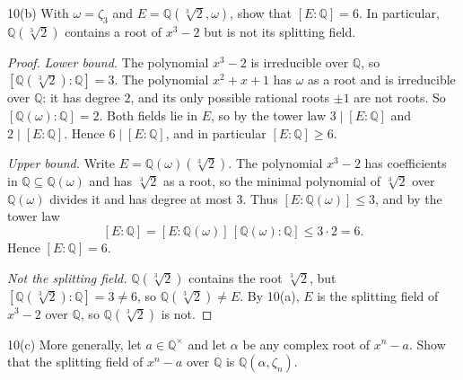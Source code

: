 \documentclass[11pt]{article}
\begin{document}
\begin{problem}{10(b)}
  With $\omega = \zeta_3$ and $E = \mathbb{Q}(\sqrt[3]{2}, \omega)$, show that
  $[E : \mathbb{Q}] = 6$. In particular, $\mathbb{Q}(\sqrt[3]{2})$ contains a
  root of $x^3 - 2$ but is not its splitting field.
\end{problem}

\begin{proof}
\emph{Lower bound.} The polynomial $x^3 - 2$ is irreducible over $\mathbb{Q}$, so
$[\mathbb{Q}(\sqrt[3]{2}):\mathbb{Q}] = 3$. The polynomial $x^2 + x + 1$ has
$\omega$ as a root and is irreducible over $\mathbb{Q}$: it has degree $2$, and
its only possible rational roots $\pm 1$ are not roots. So
$[\mathbb{Q}(\omega):\mathbb{Q}] = 2$. Both fields lie in $E$, so by the tower
law $3 \mid [E:\mathbb{Q}]$ and $2 \mid [E:\mathbb{Q}]$. Hence
$6 \mid [E:\mathbb{Q}]$, and in particular $[E:\mathbb{Q}] \ge 6$.

\emph{Upper bound.} Write $E = \mathbb{Q}(\omega)(\sqrt[3]{2})$. The polynomial
$x^3 - 2$ has coefficients in $\mathbb{Q} \subseteq \mathbb{Q}(\omega)$ and has
$\sqrt[3]{2}$ as a root, so the minimal polynomial of $\sqrt[3]{2}$ over
$\mathbb{Q}(\omega)$ divides it and has degree at most $3$. Thus
$[E:\mathbb{Q}(\omega)] \le 3$, and by the tower law
\[
  [E:\mathbb{Q}] = [E:\mathbb{Q}(\omega)]\,[\mathbb{Q}(\omega):\mathbb{Q}]
  \le 3 \cdot 2 = 6.
\]
Hence $[E:\mathbb{Q}] = 6$.

\emph{Not the splitting field.} $\mathbb{Q}(\sqrt[3]{2})$ contains the root
$\sqrt[3]{2}$, but $[\mathbb{Q}(\sqrt[3]{2}):\mathbb{Q}] = 3 \ne 6$, so
$\mathbb{Q}(\sqrt[3]{2}) \ne E$. By 10(a), $E$ is the splitting field of
$x^3 - 2$ over $\mathbb{Q}$, so $\mathbb{Q}(\sqrt[3]{2})$ is not.
\end{proof}

\begin{problem}{10(c)}
  More generally, let $a \in \mathbb{Q}^{\times}$ and let $\alpha$ be any
  complex root of $x^n - a$. Show that the splitting field of $x^n - a$ over
  $\mathbb{Q}$ is $\mathbb{Q}(\alpha, \zeta_n)$.
\end{problem}
\end{document}
